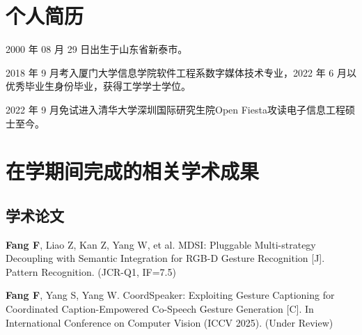 
\begin{resume}

  \section*{个人简历}

  2000 年 08 月 29 日出生于山东省新泰市。

  2018 年 9 月考入厦门大学信息学院软件工程系数字媒体技术专业，2022 年 6 月以优秀毕业生身份毕业，获得工学学士学位。

  2022 年 9 月免试进入清华大学深圳国际研究生院Open Fiesta攻读电子信息工程硕士至今。


  \section*{在学期间完成的相关学术成果}

  \subsection*{学术论文}

  \begin{achievements}
    \item \textbf{Fang F}, Liao Z, Kan Z, Yang W, et al. MDSI: Pluggable Multi-strategy Decoupling with Semantic Integration for RGB-D Gesture Recognition [J]. 
    Pattern Recognition. (JCR-Q1, IF=7.5)
    \item \textbf{Fang F}, Yang S, Yang W. CoordSpeaker: Exploiting Gesture Captioning for Coordinated Caption-Empowered Co-Speech Gesture Generation [C]. In International Conference on Computer Vision (ICCV 2025). (Under Review)
  \end{achievements}




\end{resume}
